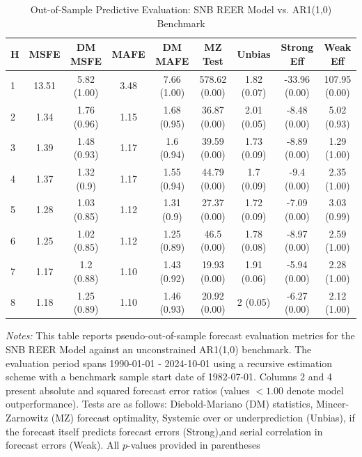 \begin{table}[htbp]
\centering
\caption{Out-of-Sample Predictive Evaluation: SNB REER Model vs. AR1(1,0) Benchmark}
\label{tab:snb_reer_model_evaluation}
\footnotesize
\begin{tabular}{l cccccccc}
\hline\hline
\rule{0pt}{3ex}
\textbf{H} & \textbf{MSFE} & \textbf{DM MSFE} & \textbf{MAFE} & \textbf{DM MAFE} & \textbf{MZ Test} & \textbf{Unbias} & \textbf{Strong Eff} & \textbf{Weak Eff} \\[0.5ex]
\hline
\rule{0pt}{2.5ex}
1 & 13.51 & 5.82 (1.00) & 3.48 & 7.66 (1.00) & 578.62 (0.00) & 1.82 (0.07) & -33.96 (0.00) & 107.95 (0.00) \\
2 & 1.34 & 1.76 (0.96) & 1.15 & 1.68 (0.95) & 36.87 (0.00) & 2.01 (0.05) & -8.48 (0.00) & 5.02 (0.93) \\
3 & 1.39 & 1.48 (0.93) & 1.17 & 1.6 (0.94) & 39.59 (0.00) & 1.73 (0.09) & -8.89 (0.00) & 1.29 (1.00) \\
4 & 1.37 & 1.32 (0.9) & 1.17 & 1.55 (0.94) & 44.79 (0.00) & 1.7 (0.09) & -9.4 (0.00) & 2.35 (1.00) \\
5 & 1.28 & 1.03 (0.85) & 1.12 & 1.31 (0.9) & 27.37 (0.00) & 1.72 (0.09) & -7.09 (0.00) & 3.03 (0.99) \\
6 & 1.25 & 1.02 (0.85) & 1.12 & 1.25 (0.89) & 46.5 (0.00) & 1.78 (0.08) & -8.97 (0.00) & 2.59 (1.00) \\
7 & 1.17 & 1.2 (0.88) & 1.10 & 1.43 (0.92) & 19.93 (0.00) & 1.91 (0.06) & -5.94 (0.00) & 2.28 (1.00) \\
8 & 1.18 & 1.25 (0.89) & 1.10 & 1.46 (0.93) & 20.92 (0.00) & 2 (0.05) & -6.27 (0.00) & 2.12 (1.00) \\
\hline\hline
\end{tabular}%
\par\smallskip
\parbox{\textwidth}{\scriptsize \textit{Notes:} This table reports pseudo-out-of-sample forecast evaluation metrics for the SNB REER Model against an unconstrained AR1(1,0) benchmark. The evaluation period spans 1990-01-01 - 2024-10-01 using a recursive estimation scheme with a benchmark sample start date of 1982-07-01. Columns 2 and 4 present absolute and squared forecast error ratios (values $< 1.00$ denote model outperformance). Tests are as follows: Diebold-Mariano (DM) statistics, Mincer-Zarnowitz (MZ) forecast optimality, Systemic over or underprediction (Unbias), if the forecast itself predicts forecast errors (Strong),and serial correlation in forecast errors (Weak). All $p$-values provided in parentheses}
\end{table}
